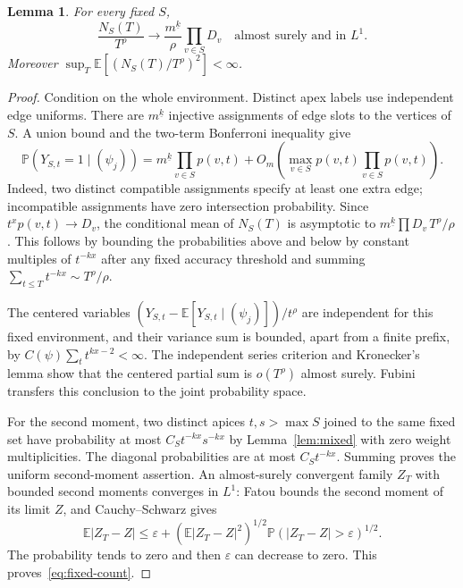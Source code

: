 \documentclass[11pt]{article}
\newtheorem{lemma}[theorem]{Lemma}
\theoremstyle{remark}\newtheorem{remark}[theorem]{Remark}
\newcommand{\E}{\mathbb E}
\newcommand{\Prob}{\mathbb P}
\newcommand{\fall}[2]{#1^{\underline{#2}}}
\begin{document}
\begin{lemma}\label{lem:neighbors}
For every fixed $S$,
\begin{equation}\label{eq:fixed-count}
 \frac{N_S(T)}{T^\rho}
 \longrightarrow \frac{\fall{m}{k}}\rho\prod_{v\in S}D_v
 \quad\text{almost surely and in }L^1.
\end{equation}
Moreover $\sup_T\E[(N_S(T)/T^\rho)^2]<\infty$.
\end{lemma}
\begin{proof}
Condition on the whole environment. Distinct apex labels use independent
edge uniforms. There are $\fall{m}{k}$ injective assignments of edge slots
to the vertices of $S$. A union bound and the two-term Bonferroni inequality
give
\begin{equation}\label{eq:occupancy}
 \Prob(Y_{S,t}=1\mid(\psi_j))
 =\fall{m}{k}\prod_{v\in S}p(v,t)
 +O_m\left(\max_{v\in S}p(v,t)\prod_{v\in S}p(v,t)\right).
\end{equation}
Indeed, two distinct compatible assignments specify at least one extra
edge; incompatible assignments have zero intersection probability.
Since $t^xp(v,t)\to D_v$, the conditional mean of $N_S(T)$ is
asymptotic to $\fall{m}{k}\prod D_v\,T^\rho/\rho$.
This follows by bounding the probabilities above and below by constant
multiples of $t^{-kx}$ after any fixed accuracy threshold and summing
$\sum_{t\le T}t^{-kx}\sim T^\rho/\rho$.

The centered variables
$(Y_{S,t}-\E[Y_{S,t}\mid(\psi_j)])/t^\rho$ are independent for this fixed
environment, and their variance sum is bounded, apart from a finite prefix,
by $C(\psi)\sum_t t^{kx-2}<\infty$.
The independent series criterion and Kronecker's lemma
\cite[Theorems~2.5.6 and~2.5.9]{durrett} show that the centered partial
sum is $o(T^\rho)$ almost surely. Fubini transfers this conclusion to the
joint probability space.

For the second moment, two distinct apices $t,s>\max S$ joined to the
same fixed set have probability at most $C_S t^{-kx}s^{-kx}$ by
Lemma~\ref{lem:mixed} with zero weight multiplicities. The diagonal
probabilities are at most $C_S t^{-kx}$. Summing proves the uniform
second-moment assertion. An almost-surely convergent family $Z_T$ with
bounded second moments converges in $L^1$: Fatou bounds the second moment
of its limit $Z$, and Cauchy--Schwarz gives
\[
 \E|Z_T-Z|\le\varepsilon+
 (\E|Z_T-Z|^2)^{1/2}\Prob(|Z_T-Z|>\varepsilon)^{1/2}.
\]
The probability tends to zero and then $\varepsilon$ can decrease to zero.
This proves~\eqref{eq:fixed-count}.
\end{proof}
\end{document}
